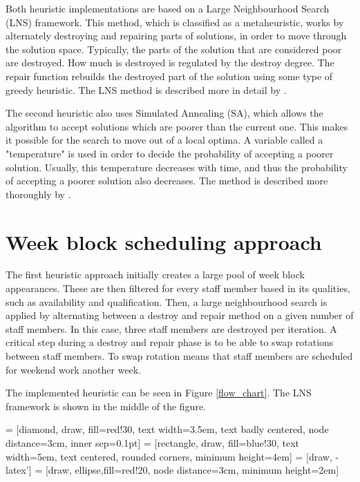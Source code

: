 Both heuristic implementations are based on a Large Neighbourhood Search (LNS) framework. This method, which is classified as a metaheuristic, works by alternately destroying and repairing parts of solutions, in order to move through the solution space. Typically, the parts of the solution that are considered poor are destroyed. How much is destroyed is regulated by the destroy degree. The repair function rebuilds the destroyed part of the solution using some type of greedy heuristic. The LNS method is described more in detail by \citet{pisinger_2010}. 

The second heuristic also uses Simulated Annealing (SA), which allows the algorithm to accept solutions which are poorer than the current one. This makes it possible for the search to move out of a local optima. A variable called a "temperature" is used in order to decide the probability of accepting a poorer solution. Usually, this temperature decreases with time, and thus the probability of accepting a poorer solution also decreases. The method is described more thoroughly by \citet{pisinger_2010}.

\section{Week block scheduling approach} \label{section:impl_week_dist}

The first heuristic approach initially creates a large pool of week block appearances. These are then filtered for every staff member based in its qualities, such as availability and qualification. Then, a large neighbourhood search is applied by alternating between a destroy and repair method on a given number of staff members. In this case, three staff members are destroyed per iteration. A critical step during a destroy and repair phase is to be able to swap rotations between staff members. To swap rotation means that staff members are scheduled for weekend work another week.

The implemented heuristic can be seen in Figure \ref{flow_chart}. The LNS framework is shown in the middle of the figure.

 = [diamond, draw, fill=red!30,
    text width=3.5em, text badly centered, node distance=3cm, inner sep=0.1pt]
 = [rectangle, draw, fill=blue!30,
    text width=5em, text centered, rounded corners, minimum height=4em]
 = [draw, -latex']
 = [draw, ellipse,fill=red!20, node distance=3cm,
    minimum height=2em]

